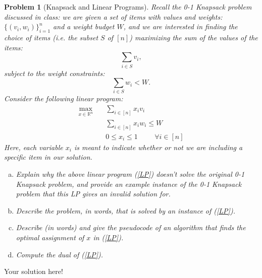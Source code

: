 \documentclass[10pt]{article}
\newtheorem{problem}{\sc\color{cit}Problem}
\begin{document}
\begin{problem}[Knapsack and Linear Programs]
Recall the 0-1 Knapsack problem discussed in class: we are given a set of items with values and weights: $\{(v_i,w_i)\}_{i=1}^n$ and a weight budget $W$, and we are interested in finding the choice of items (i.e. the subset $S$ of $[n]$) maximizing the sum of the values of the items:
\[
    \sum_{i\in S} v_i,
\]
subject to the weight constraints:
\[
    \sum_{i\in S} w_i < W.
\]
Consider the following linear program:
\begin{align}\label{LP}
    \max_{x \in \mathbb{R}^n} \quad &\sum_{i\in [n]}x_iv_i\\
    &  \sum_{i\in [n]}x_i w_i \leq W \nonumber \\
    & 0 \leq x_i \leq 1 \hspace{1cm} \forall i\in [n]\nonumber 
\end{align}
Here, each variable $x_i$ is meant to indicate whether or not we are including a specific item in our solution.
\begin{enumerate}[(a)]
    \item Explain why the above linear program (\ref{LP}) doesn't solve the original 0-1 Knapsack problem, and provide an example instance of the 0-1 Knapsack problem that this LP gives an invalid solution for. 
    \item Describe the problem, in words, that is solved by an instance of (\ref{LP}).
    \item Describe (in words) and give the pseudocode of an algorithm that finds the optimal assignment of $x$ in (\ref{LP}).
    \item Compute the dual of (\ref{LP}).
\end{enumerate}

\end{problem}

\begin{solution}
Your solution here!
\end{solution}

\newpage
\end{document}
